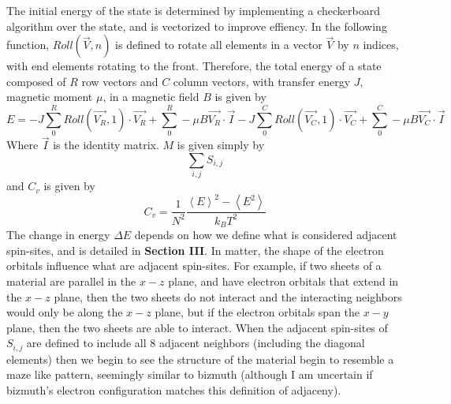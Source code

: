 \documentclass{article}
\begin{document}
\indent The initial energy of the state is determined by implementing a
checkerboard algorithm over the state, and is vectorized to improve effiency.
In the following function, $Roll(\vec{V}, n)$ is defined to rotate all elements 
in a vector $\vec{V}$ by $n$ indices, with end elements rotating to the front.
Therefore, the total energy of a state composed of $R$ row vectors and $C$ column
vectors, with transfer energy $J$, magnetic moment $\mu$,
in a magnetic field $B$ is given by
\begin{equation}
  E = -J\sum_0^R Roll(\vec{V_R}, 1) \cdot \vec{V_R} + \sum_0^R -\mu B\vec{V_R} \cdot
  \vec{I}
  -J\sum_0^C Roll(\vec{V_C}, 1) \cdot \vec{V_C} + \sum_0^C -\mu B\vec{V_C} \cdot \vec{I}
\end{equation}
Where $\vec{I}$ is the identity matrix.
$M$ is given simply by
\begin{equation}
  \sum_{i,j} S_{i,j}
\end{equation}
and $C_v$ is given by
\begin{equation}
  C_v = \frac{1}{N^2}
  \frac{\left\langle E\right\rangle^2 - \left\langle E^2\right\rangle}{k_BT^2}
\end{equation}
\indent The change in energy $\Delta E$ depends on how we define what is considered
adjacent spin-sites, and is detailed in \textbf{Section III}.
In matter, the shape of the electron orbitals influence what
are adjacent spin-sites. For example, if two sheets of a material are parallel in 
the $x-z$ plane, and have electron orbitals that extend in the $x-z$ plane, then
the two sheets do not interact and the interacting neighbors would only be along
the $x-z$ plane, but if the electron orbitals span the $x-y$ plane, then the two
sheets are able to interact. When the adjacent spin-sites of $S_{i,j}$ are defined
to include all 8 adjacent neighbors (including the diagonal elements) then we 
begin to see the structure of the material begin to resemble a maze like 
pattern, seemingly similar to bizmuth (although I am uncertain if bizmuth's
electron configuration matches this definition of adjaceny).
\end{document}
